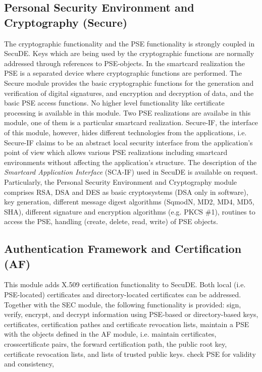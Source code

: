 \subsection{Personal Security Environment and Cryptography (Secure)}
 
The cryptographic functionality and the PSE functionality
is strongly coupled in SecuDE. Keys which are being
used by the cryptographic functions are normally addressed
through references to PSE-objects. In the smartcard realization
the PSE is a separated device where cryptographic functions
are performed. The Secure module provides
the basic cryptographic functions for the generation and 
verification of digital signatures, and encryption and decryption 
of data, and the basic PSE access functions. No higher level
functionality like certificate processing is available in this module.
Two PSE realizations are availabe in this module, one of them
is a particular smartcard realization. Secure-IF, the interface of 
this module, however, hides different technologies from
the applications, i.e. Secure-IF claims to be an abstract local security
interface from the application's point of view which allows various
PSE realizations including smartcard environments without affecting 
the application's structure.
The description of the {\em Smartcard Application Interface} (SCA-IF) 
used in SecuDE is available on request.
Particularly, the Personal Security Environment and Cryptography 
module comprises
\bi
\m RSA, DSA and DES as basic cryptosystems (DSA only in software),
\m key generation,
\m different message digest algorithms (SqmodN, MD2, MD4, MD5, SHA), 
\m different signature and encryption algorithms (e.g. PKCS \#1),
\m routines to access the PSE, handling (create, delete, read, write)
   of PSE objects.
\ei

\subsection{Authentication Framework and Certification (AF)}

This module adds X.509 certification functionality to SecuDE.
Both local (i.e. PSE-located) certificates and directory-located
certificates can be addressed. Together with the SEC module, the
following functionality is provided:
\bi
\m sign, verify, encrypt, and decrypt information using PSE-based or 
   directory-based keys, certificates, certification pathes and 
   certificate revocation lists,
\m maintain a PSE with the objects defined in the AF 
   module, i.e. maintain certificates, crosscertificate pairs,
   the forward certification path, the public root key,
   certificate revocation lists, and lists of trusted public keys.
\m check PSE for validity and consistency,
\ei

